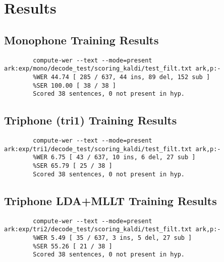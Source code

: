 %
%
%                 

\chapter{Results}
\label{sec:appendixc}

\section*{Monophone Training Results}

{\lstset{
		basicstyle=\ttfamily\small,
		frame=single,
		breaklines=true,
		breakatwhitespace=true,
		columns=fullflexible
	}
	\begin{lstlisting}
		compute-wer --text --mode=present ark:exp/mono/decode_test/scoring_kaldi/test_filt.txt ark,p:- 
		%WER 44.74 [ 285 / 637, 44 ins, 89 del, 152 sub ]
		%SER 100.00 [ 38 / 38 ]
		Scored 38 sentences, 0 not present in hyp.
	\end{lstlisting}
}

\vspace{1em}

\section*{Triphone (tri1) Training Results}

{\lstset{
		basicstyle=\ttfamily\small,
		frame=single,
		breaklines=true,
		breakatwhitespace=true,
		columns=fullflexible
	}
	\begin{lstlisting}
		compute-wer --text --mode=present ark:exp/tri1/decode_test/scoring_kaldi/test_filt.txt ark,p:- 
		%WER 6.75 [ 43 / 637, 10 ins, 6 del, 27 sub ]
		%SER 65.79 [ 25 / 38 ]
		Scored 38 sentences, 0 not present in hyp.
	\end{lstlisting}
}

\vspace{1em}

\section*{Triphone LDA+MLLT Training Results}

{\lstset{
		basicstyle=\ttfamily\small,
		frame=single,
		breaklines=true,
		breakatwhitespace=true,
		columns=fullflexible
	}
	\begin{lstlisting}
		compute-wer --text --mode=present ark:exp/tri2/decode_test/scoring_kaldi/test_filt.txt ark,p:- 
		%WER 5.49 [ 35 / 637, 3 ins, 5 del, 27 sub ]
		%SER 55.26 [ 21 / 38 ]
		Scored 38 sentences, 0 not present in hyp.
	\end{lstlisting}
}

